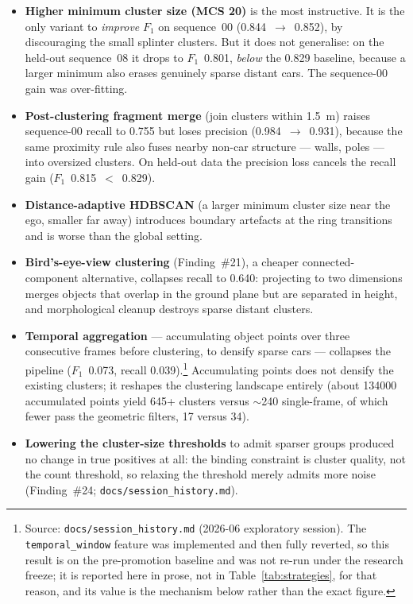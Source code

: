 \begin{itemize}
  \item \textbf{Higher minimum cluster size (MCS \num{20})} is the most instructive.
    It is the only variant to \emph{improve} $F_1$ on sequence~00
    (\num{0.844}~$\rightarrow$~\num{0.852}), by discouraging the small splinter
    clusters. But it does not generalise: on the held-out sequence~08 it drops to
    $F_1$~\num{0.801}, \emph{below} the \num{0.829} baseline, because a larger
    minimum also erases genuinely sparse distant cars. The sequence-00 gain was
    over-fitting.
  \item \textbf{Post-clustering fragment merge} (join clusters within
    \SI{1.5}{\metre}) raises sequence-00 recall to \num{0.755} but loses precision
    (\num{0.984}~$\rightarrow$~\num{0.931}), because the same proximity rule also
    fuses nearby non-car structure --- walls, poles --- into oversized clusters. On
    held-out data the precision loss cancels the recall gain
    ($F_1$~\num{0.815}~$<$~\num{0.829}).
  \item \textbf{Distance-adaptive HDBSCAN} (a larger minimum cluster size near the
    ego, smaller far away) introduces boundary artefacts at the ring transitions and
    is worse than the global setting.
  \item \textbf{Bird's-eye-view clustering} (Finding~\#21), a cheaper
    connected-component alternative, collapses recall to \num{0.640}: projecting to
    two dimensions merges objects that overlap in the ground plane but are separated
    in height, and morphological cleanup destroys sparse distant clusters.
  \item \textbf{Temporal aggregation} --- accumulating object points over three
    consecutive frames before clustering, to densify sparse cars --- collapses the
    pipeline ($F_1$~\num{0.073}, recall \num{0.039}).\footnote{Source:
    \texttt{docs/session\_history.md} (2026-06 exploratory session). The
    \texttt{temporal\_window} feature was implemented and then fully reverted, so
    this result is on the pre-promotion baseline and was not re-run under the
    research freeze; it is reported here in prose, not in Table~\ref{tab:strategies},
    for that reason, and its value is the mechanism below rather than the exact
    figure.} Accumulating points does not densify
    the existing clusters; it reshapes the clustering landscape entirely
    (about \num{134000} accumulated points yield \num{645}+ clusters versus
    $\sim$\num{240} single-frame, of which fewer pass the geometric filters,
    \num{17} versus \num{34}).
  \item \textbf{Lowering the cluster-size thresholds} to admit sparser groups
    produced no change in true positives at all: the binding constraint is cluster
    quality, not the count threshold, so relaxing the threshold merely admits more
    noise (Finding~\#24; \texttt{docs/session\_history.md}).
\end{itemize}

